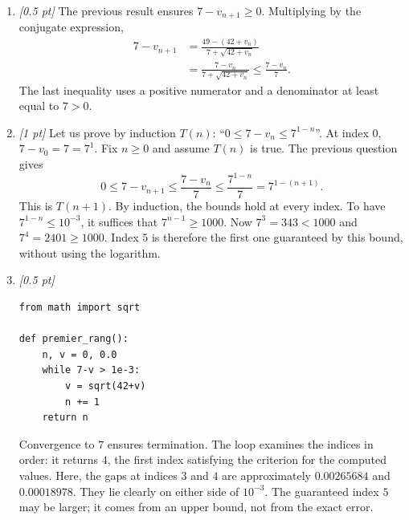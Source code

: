 \begin{enumerate}
\item \textit{[0.5 pt]} The previous result ensures $7-v_{n+1}\ge0$. Multiplying by the conjugate expression,
\[\begin{aligned}7-v_{n+1}&=\frac{49-(42+v_n)}{7+\sqrt{42+v_n}}\\&=\frac{7-v_n}{7+\sqrt{42+v_n}}\le\frac{7-v_n}{7}.\end{aligned}\]
The last inequality uses a positive numerator and a denominator at least equal to $7>0$.

\item \textit{[1 pt]} Let us prove by induction $T(n)$: ``$0\le 7-v_n\le 7^{1-n}$''.
At index $0$, $7-v_0=7=7^1$. Fix $n\ge0$ and assume $T(n)$ is true. The previous question gives
\[0\le 7-v_{n+1}\le\frac{7-v_n}{7}\le\frac{7^{1-n}}{7}=7^{1-(n+1)}.\]
This is $T(n+1)$. By induction, the bounds hold at every index.
To have $7^{1-n}\le10^{-3}$, it suffices that $7^{n-1}\ge1000$.
Now $7^{3}=343<1000$ and $7^{4}=2401\ge1000$. Index $5$ is therefore the first one guaranteed by this bound, without using the logarithm.


\item \textit{[0.5 pt]} 
\begin{lstlisting}
from math import sqrt

def premier_rang():
    n, v = 0, 0.0
    while 7-v > 1e-3:
        v = sqrt(42+v)
        n += 1
    return n
\end{lstlisting}
Convergence to $7$ ensures termination. The loop examines the indices in order: it returns $4$, the first index satisfying the criterion for the computed values. Here, the gaps at indices $3$ and $4$ are approximately $\num{0,00265684}$ and $\num{0,00018978}$. They lie clearly on either side of $10^{-3}$. The guaranteed index $5$ may be larger; it comes from an upper bound, not from the exact error.

\end{enumerate}

